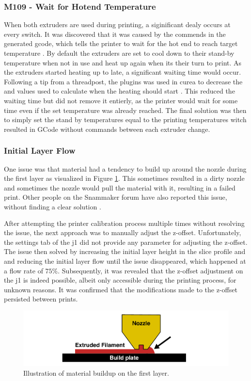 \subsubsection{M109 - Wait for Hotend Temperature}
When both extruders are used during printing, a siginificant dealy occurs at every switch.
It was discovered that it was caused by the  commends in the generated \gls{gcode}, which tells the printer to wait for the hot end to reach target temperature \cite{thinkyheadWaitHotendTemperature2023}.
By default the extruders are set to cool down to their stand-by temperature when not in use and heat up again when its their turn to print.
As the extruders started heating up to late, a significant waiting time would occur.
Following a tip from a threadpost, the  plugins was used in curea to decrease the  and  values used to calculate when the heating should start \cite{valiantReplyStandbyTemperature2022} \cite{fieldofviewPrinterSettingsUltimaker}.
This reduced the waiting time but did not remove it entierly, as the printer would wait for some time even if the set temperature was already reached.
The final solution was then to simply set the stand by temperatures equal to the printing temperatures witch resulted in GCode without  commands between each extruder change.


\subsubsection{Initial Layer Flow}
One issue was that material had a tendency to build up around the nozzle during the first layer as visualized in Figure \ref{fig:first_layer_buildup}.
This sometimes resulted in a dirty nozzle and sometimes the nozzle would pull the material with it, resulting in a failed print.
Other people on the Snammaker forum have also reported this issue, without finding a clear solution \cite{artezioFinerAdjustmentsOffset2021} \cite{napsZHeightCalibrationOffset2023}.

After attempting the printer calibration process multiple times without resolving the issue, the next approach was to manually adjust the z-offset.
Unfortunately, the settings tab of the \gls{j1} did not provide any parameter for adjusting the z-offset.
The issue then solved by increasing the initial layer height in the slice profile and and reducing the initial layer flow until the issue disappeared, which happened at a flow rate of $75\%$.
Subsequently, it was revealed that the z-offset adjustment on the \gls{j1} is indeed possible, albeit only accessible during the printing process, for unknown reasons.
It was confirmed that the modifications made to the z-offset persisted between prints.

\begin{figure}[H]
    \centering
    \includegraphics[width=\textwidth]{figures/3d_print/first_layer_buildup.pdf}
    \caption{Illustration of material buildup on the first layer.}
    \label{fig:first_layer_buildup}
\end{figure}